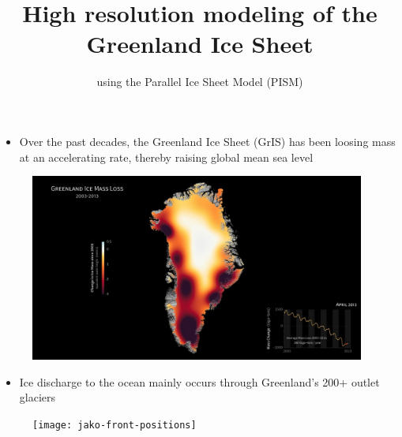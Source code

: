 \documentclass[hide notes,intlimits]{beamer}
\title[] %
{High resolution modeling of the Greenland Ice Sheet}
\subtitle{using the Parallel Ice Sheet Model (PISM)}
\author[Aschwanden, Fahnestock, Truffer] %
{}
\institute[Geophysical Institute] %
{}
\date{}
\begin{document}


  {
} 


\begin{frame}
  \titlepage
\end{frame}

{
%
} 

  {
} 

\begin{frame}[plain]
    \begin{itemize}
    \item Over the past decades, the Greenland Ice Sheet (GrIS) has been loosing mass at an accelerating rate, thereby raising global mean sea level
    \end{itemize}
    \begin{figure}
      \includegraphics[width=11cm]{grace_greenland_2004_2012_still_print} \\
  \end{figure}
\end{frame}

\begin{frame}[plain]
    \begin{itemize}
    \item Ice discharge to the ocean mainly occurs through Greenland's 200+ outlet glaciers
    \end{itemize}
    \begin{figure}
      \texttt{[image: jako-front-positions]}
  \end{figure}
\end{frame}
\end{document}
